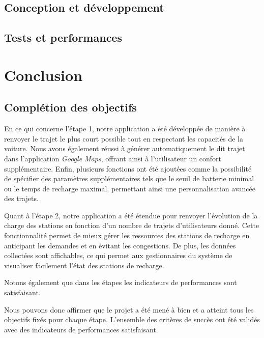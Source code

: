 \documentclass[a4paper, 12pt]{report}
\begin{document}
\clearpage

\section{Conception et développement}
\section{Tests et performances}

\chapter{Conclusion}
\minitoc
{}
\clearpage
\section{Complétion des objectifs}

En ce qui concerne l'étape 1, notre application a été développée de manière à renvoyer le trajet le plus court possible tout en respectant les capacités de la voiture. Nous avons également réussi à générer automatiquement le dit trajet dans l'application \textit{Google Maps}, offrant ainsi à l'utilisateur un confort supplémentaire. Enfin, plusieurs fonctions ont été ajoutées comme la possibilité de spécifier des paramètres supplémentaires tels que le seuil de batterie minimal ou le temps de recharge maximal, permettant ainsi une personnalisation avancée des trajets. 
\bigskip

Quant à l'étape 2, notre application a été étendue pour renvoyer l'évolution de la charge des stations en fonction d'un nombre de trajets d'utilisateurs donné. Cette fonctionnalité permet de mieux gérer les ressources des stations de recharge en anticipant les demandes et en évitant les congestions. De plus, les données collectées sont affichables, ce qui permet aux gestionnaires du système de visualiser facilement l'état des stations de recharge.
\bigskip

Notons également que dans les étapes les indicateurs de performances sont satisfaisant.
\bigskip

Nous pouvons donc affirmer que le projet a été mené à bien et a atteint tous les objectifs fixés pour chaque étape. L'ensemble des critères de succès ont été validés avec des indicateurs de performances satisfaisant.
\clearpage
\end{document}
